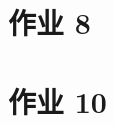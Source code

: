 \documentclass[main.tex]{subfiles}
\begin{document}
\section{作业 8}

\section{作业 10}

\end{document}

